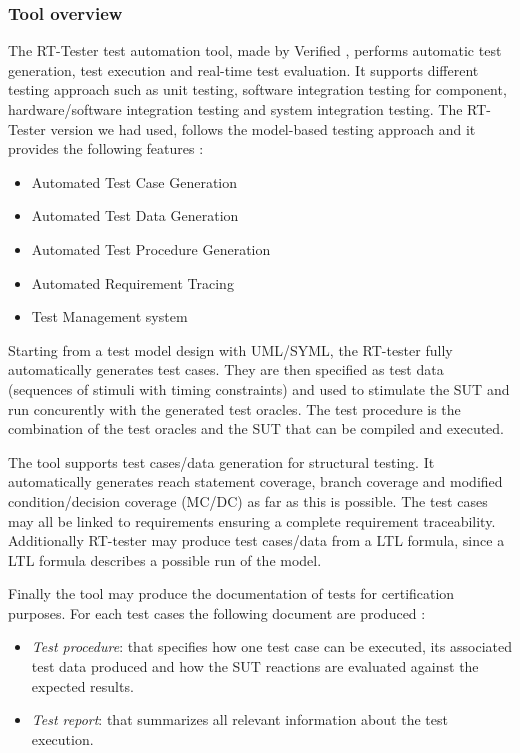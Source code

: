 \subsubsection{Tool overview}

The RT-Tester test automation tool, made by Verified
\cite{verified_website}, performs automatic test generation, test
execution and real-time test evaluation.  It supports different
testing approach such as unit testing, software integration testing
for component, hardware/software integration testing and system
integration testing.  The RT-Tester version we had used, follows the
model-based testing approach \cite{Peleska2011,rttmbtreport2011} and
it provides the following features :
\begin{itemize}
\item Automated Test Case Generation 
\item Automated Test Data Generation 
\item Automated Test Procedure Generation 
\item Automated Requirement Tracing 
\item Test Management system 
\end{itemize}
Starting from a test model design with UML/SYML, the RT-tester fully
automatically generates test cases. They are then specified as test
data (sequences of stimuli with timing constraints) and used to
stimulate the SUT and run concurently with the generated test
oracles. The test procedure is the combination of the test oracles and
the SUT that can be compiled and executed.

The tool supports test cases/data generation for structural
testing. It automatically generates  reach statement coverage, branch coverage and
modified condition/decision coverage (MC/DC) as far as this is possible.
The test cases may all be linked to requirements ensuring a complete
requirement traceability. 
Additionally RT-tester may produce test cases/data from a LTL
formula, since a LTL formula describes a possible run of the model.


Finally the tool may produce the documentation of tests for
certification purposes. For each test cases the following document are
produced :
\begin{itemize}
\item {\em Test procedure}: that specifies  how one test case can be
  executed, its associated test data produced and how the SUT
  reactions are evaluated against the expected results.
\item {\em Test report}: that summarizes all relevant information
  about the test execution.
\end{itemize}

